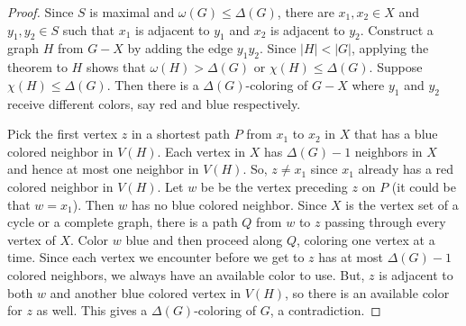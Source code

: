 \documentclass[openany]{tufte-book} %
\theoremstyle{plain}
\newcommand{\card}[1]{\left|#1\right|}
\begin{document}
\begin{proof}
Since $S$ is maximal and $\omega(G) \le \Delta(G)$, there are $x_1, x_2 \in X$ and $y_1, y_2 \in S$ such that $x_1$ is adjacent to $y_1$ and $x_2$ is adjacent to $y_2$.
Construct a graph $H$ from $G-X$ by adding the edge $y_1y_2$.  Since $\card{H} < \card{G}$, applying the theorem to $H$ shows that $\omega(H) > \Delta(G)$ or $\chi(H) \le \Delta(G)$.
Suppose $\chi(H) \le \Delta(G)$.  Then there is a $\Delta(G)$-coloring of $G-X$ where $y_1$ and $y_2$ receive different colors, say red and blue respectively.

Pick the first vertex $z$ in a shortest path $P$ from $x_1$ to $x_2$ in $X$ that has a blue colored neighbor in $V(H)$. 
Each vertex in $X$ has $\Delta(G)-1$ neighbors in $X$ and hence at most one neighbor in $V(H)$.  So, $z \ne x_1$ since $x_1$ already has a red colored neighbor in $V(H)$.
Let $w$ be be the vertex preceding $z$ on $P$ (it could be that $w = x_1$). Then $w$ has no blue colored neighbor.  Since $X$ is the vertex set of a cycle or a 
complete graph, there is a path $Q$ from $w$ to $z$ passing through every vertex of $X$.  Color $w$ blue and then proceed along $Q$, coloring one vertex at a time.  
Since each vertex we encounter before we get to $z$ has at most $\Delta(G) - 1$ colored neighbors, we always have an available color to use.  But, $z$ is adjacent
to both $w$ and another blue colored vertex in $V(H)$, so there is an available color for $z$ as well.  This gives a $\Delta(G)$-coloring of $G$, a contradiction.


\end{proof}
\end{document}
